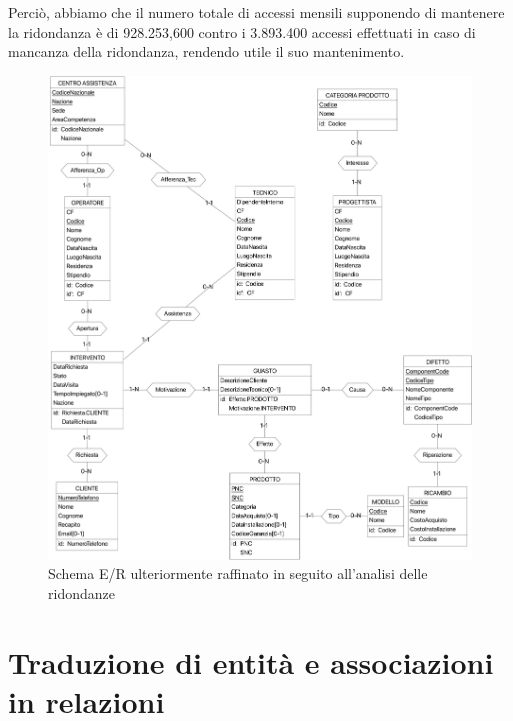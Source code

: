 \documentclass[a4paper, 12pt]{report}
\begin{document}
Perciò, abbiamo che il numero totale di accessi mensili supponendo di mantenere la ridondanza è di 928.253,600 contro i 3.893.400 accessi effettuati in caso di mancanza della
ridondanza, rendendo utile il suo mantenimento.

\begin{figure}[H]
	\centering
	\includegraphics[width=\linewidth]{images/Unredundant.png}
	\caption{Schema E/R ulteriormente raffinato in seguito all'analisi delle ridondanze}
\end{figure}

\section{Traduzione di entità e associazioni in relazioni}
\end{document}
